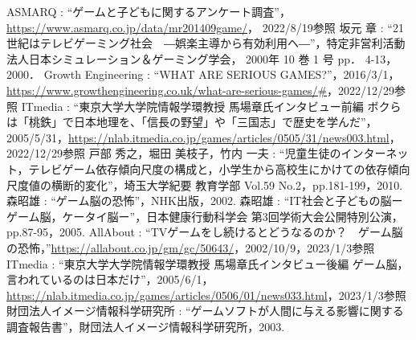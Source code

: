 \documentclass[12pt,a4j,titlepage]{ltjsarticle}
\begin{document}
\clearpage
\begin{thebibliography}{99}
 ASMARQ : ``ゲームと子どもに関するアンケート調査''， \url{https://www.asmarq.co.jp/data/mr201409game/}， 2022/8/19参照
 坂元 章 : ``21世紀はテレビゲーミング社会　―娯楽主導から有効利用ヘ―''，特定非営利活動法人日本シミュレーション＆ゲーミング学会， 2000年 10 巻 1 号 pp． 4-13， 2000．
Growth Engineering : ``WHAT ARE SERIOUS GAMES?''，2016/3/1，\url{https://www.growthengineering.co.uk/what-are-serious-games/#}，2022/12/29参照
ITmedia : ``東京大学大学院情報学環教授 馬場章氏インタビュー前編 ボクらは「桃鉄」で日本地理を、「信長の野望」や「三国志」で歴史を学んだ''，2005/5/31，\url{https://nlab.itmedia.co.jp/games/articles/0505/31/news003.html}，2022/12/29参照
戸部 秀之，堀田 美枝子，竹内 一夫 : ``児童生徒のインターネット，テレビゲーム依存傾向尺度の構成と，小学生から高校生にかけての依存傾向尺度値の横断的変化''，埼玉大学紀要 教育学部 Vol.59 No.2，pp.181-199，2010.
森昭雄 : ``ゲーム脳の恐怖''，NHK出版，2002.
森昭雄 : ``IT社会と子どもの脳ーゲーム脳，ケータイ脳ー''，日本健康行動科学会 第3回学術大会公開特別公演，pp.87-95，2005.
AllAbout : ``TVゲームをし続けるとどうなるのか？　ゲーム脳の恐怖，''\url{https://allabout.co.jp/gm/gc/50643/}，2002/10/9，2023/1/3参照
ITmedia : ``東京大学大学院情報学環教授 馬場章氏インタビュー後編 ゲーム脳，言われているのは日本だけ''，2005/6/1，\url{https://nlab.itmedia.co.jp/games/articles/0506/01/news033.html}，2023/1/3参照
財団法人イメージ情報科学研究所 : ``ゲームソフトが人間に与える影響に関する調査報告書''，財団法人イメージ情報科学研究所，2003.
\end{thebibliography}
\end{document}
